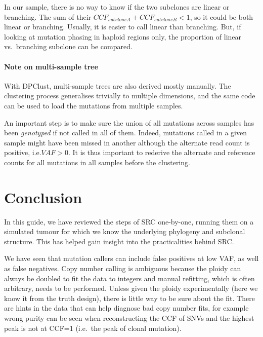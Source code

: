 \documentclass[]{article}
\let\oldparagraph\paragraph
\renewcommand{\paragraph}[1]{\oldparagraph{#1}\mbox{}}
\begin{document}
In our sample, there is no way to know if the two subclones are linear
or branching. The sum of their \(CCF_{subcloneA}+CCF_{subcloneB}<1\), so
it could be both linear or branching. Usually, it is easier to call
linear than branching. But, if looking at mutation phasing in haploid
regions only, the proportion of linear vs.~branching subclone can be
compared.

\hypertarget{note-on-multi-sample-tree}{%
\paragraph{Note on multi-sample tree}\label{note-on-multi-sample-tree}}

With DPClust, multi-sample trees are also derived mostly manually. The
clustering process generalises trivially to multiple dimensions, and the
same code can be used to load the mutations from multiple samples.

An important step is to make sure the union of all mutations across
samples has been \emph{genotyped} if not called in all of them. Indeed,
mutations called in a given sample might have been missed in another
although the alternate read count is positive, i.e.\(VAF>0\). It is thus
important to rederive the alternate and reference counts for all
mutations in all samples before the clustering.

\newpage

\hypertarget{conclusion}{%
\section{Conclusion}\label{conclusion}}

In this guide, we have reviewed the steps of SRC one-by-one, running
them on a simulated tumour for which we know the underlying phylogeny
and subclonal structure. This has helped gain insight into the
practicalities behind SRC.

We have seen that mutation callers can include false positives at low
VAF, as well as false negatives. Copy number calling is ambiguous
because the ploidy can always be doubled to fit the data to integers and
manual refitting, which is often arbitrary, needs to be performed.
Unless given the ploidy experimentally (here we know it from the truth
design), there is little way to be sure about the fit. There are hints
in the data that can help diagnose bad copy number fits, for example
wrong purity can be seen when reconstructing the CCF of SNVs and the
highest peak is not at CCF=1 (i.e.~the peak of clonal mutation).
\end{document}
